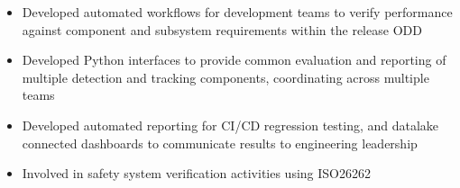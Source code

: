 \begin{itemize} [leftmargin = \itemmargin]
	\item Developed automated workflows for development teams to verify performance against component and subsystem requirements within the release ODD
	\item Developed Python interfaces to provide common evaluation and reporting of multiple detection and tracking components, coordinating across multiple teams
	\item Developed automated reporting for CI/CD regression testing, and datalake connected dashboards to communicate results to engineering leadership 
	\item Involved in safety system verification activities using ISO26262
	
\end{itemize} \\